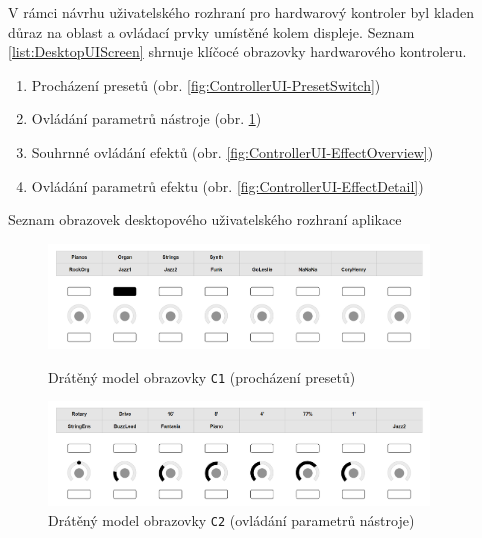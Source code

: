\documentclass[thesis=M,czech]{FITthesis}[2019/03/06]
\begin{document}
		V rámci návrhu uživatelského rozhraní pro hardwarový kontroler byl kladen důraz na oblast a ovládací prvky umístěné kolem displeje.
	 	Seznam \ref{list:DesktopUIScreen} shrnuje klíčocé obrazovky hardwarového kontroleru.
		\begin{mylist}
			\begin{enumerate}[label=\textbf{C\arabic*.}]
				\item Procházení presetů (obr. \ref{fig:ControllerUI-PresetSwitch})
				\item Ovládání parametrů nástroje (obr. \ref{fig:ControllerUI-PresetDetail})
				\item Souhrnné ovládání efektů  (obr. \ref{fig:ControllerUI-EffectOverview})
				\item Ovládání parametrů efektu (obr. \ref{fig:ControllerUI-EffectDetail})
			\end{enumerate}
			\caption{Seznam obrazovek desktopového uživatelského rozhraní aplikace}\label{list:DesktopUIScreen}		
		\end{mylist}
		
		\begin{figure}
			\centering
			\includegraphics[width=0.9\textwidth]{ControllerUI-PresetSwitch}
			\caption{Drátěný model obrazovky \texttt{C1} (procházení presetů)}
			\label{fig:ControllerUI-PresetSwitch}			
			\vspace{1.2cm}
			\includegraphics[width=0.9\textwidth]{ControllerUI-PresetDetail}
			\caption{Drátěný model obrazovky \texttt{C2} (ovládání parametrů nástroje)}
			\label{fig:ControllerUI-PresetDetail}
		\end{figure}
		
\end{document}
